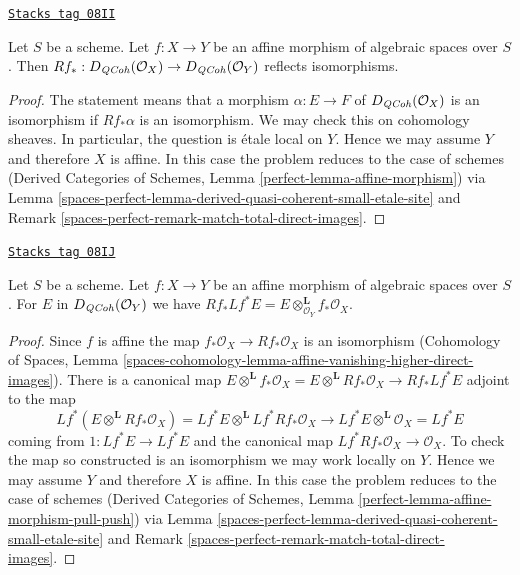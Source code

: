 \begin{lemma}
\label{spaces-perfect-lemma-affine-morphism}
\href{https://stacks.math.columbia.edu/tag/08II}{\texttt{Stacks tag 08II}}

Let $S$ be a scheme. Let $f : X \to Y$ be an affine morphism of algebraic
spaces over $S$. Then
$Rf_* : D_{\mathit{QCoh}}(\mathcal{O}_X) \to D_{\mathit{QCoh}}(\mathcal{O}_Y)$
reflects isomorphisms.
\end{lemma}

\begin{proof}
The statement means that a morphism $\alpha : E \to F$ of
$D_{\mathit{QCoh}}(\mathcal{O}_X)$ is an isomorphism if
$Rf_*\alpha$ is an isomorphism. We may check this on cohomology sheaves.
In particular, the question is \'etale local on $Y$. Hence we may assume
$Y$ and therefore $X$ is affine. In this case the problem reduces to the
case of schemes
(Derived Categories of Schemes, Lemma \ref{perfect-lemma-affine-morphism})
via Lemma \ref{spaces-perfect-lemma-derived-quasi-coherent-small-etale-site} and
Remark \ref{spaces-perfect-remark-match-total-direct-images}.
\end{proof}

\begin{lemma}
\label{spaces-perfect-lemma-affine-morphism-pull-push}
\href{https://stacks.math.columbia.edu/tag/08IJ}{\texttt{Stacks tag 08IJ}}

Let $S$ be a scheme. Let $f : X \to Y$ be an affine morphism of algebraic
spaces over $S$. For $E$ in $D_{\mathit{QCoh}}(\mathcal{O}_Y)$ we have
$Rf_* Lf^* E = E \otimes^\mathbf{L}_{\mathcal{O}_Y} f_*\mathcal{O}_X$.
\end{lemma}

\begin{proof}
Since $f$ is affine the map $f_*\mathcal{O}_X \to Rf_*\mathcal{O}_X$
is an isomorphism (Cohomology of Spaces, Lemma
\ref{spaces-cohomology-lemma-affine-vanishing-higher-direct-images}).
There is a canonical map
$E \otimes^\mathbf{L} f_*\mathcal{O}_X =
E \otimes^\mathbf{L} Rf_*\mathcal{O}_X \to Rf_* Lf^* E$
adjoint to the map
$$
Lf^*(E \otimes^\mathbf{L} Rf_*\mathcal{O}_X) =
Lf^*E \otimes^\mathbf{L} Lf^*Rf_*\mathcal{O}_X \longrightarrow
Lf^* E \otimes^\mathbf{L} \mathcal{O}_X = Lf^* E
$$
coming from $1 : Lf^*E \to Lf^*E$ and the canonical map
$Lf^*Rf_*\mathcal{O}_X \to \mathcal{O}_X$. To check the map so constructed
is an isomorphism we may work locally on $Y$. Hence we may assume
$Y$ and therefore $X$ is affine. In this case the problem reduces to the
case of schemes
(Derived Categories of Schemes, Lemma
\ref{perfect-lemma-affine-morphism-pull-push})
via Lemma \ref{spaces-perfect-lemma-derived-quasi-coherent-small-etale-site} and
Remark \ref{spaces-perfect-remark-match-total-direct-images}.
\end{proof}

